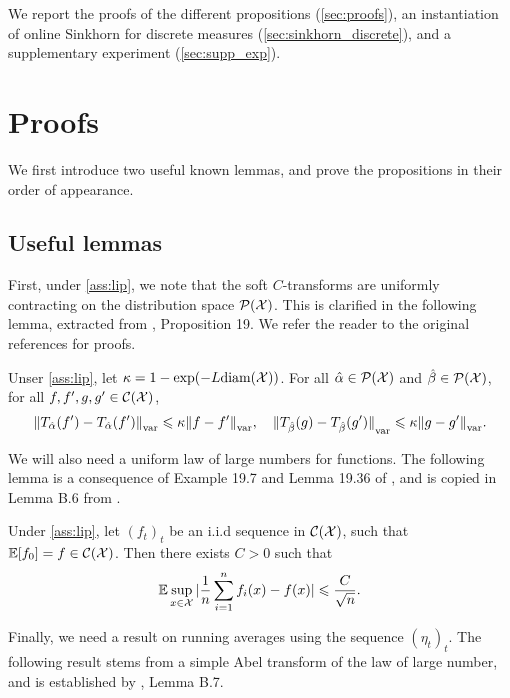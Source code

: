 We report the proofs of the different propositions (\autoref{sec:proofs}), an instantiation of online Sinkhorn for discrete measures (\autoref{sec:sinkhorn_discrete}), and a supplementary experiment (\autoref{sec:supp_exp}).

\section{Proofs}\label{sec:proofs}

We first introduce two useful known lemmas, and prove the propositions in their order of appearance.

\subsection{Useful lemmas}

First, under \autoref{ass:lip}, we note that the soft $C$-transforms are
 uniformly contracting on the distribution space $\mathcal{P}(\mathcal{X})$. This is clarified
 in the following lemma, extracted from \citet{vialard2019elementary},
 Proposition 19. We refer the reader to the original references for proofs.

\begin{lemma}\label{lemma:contractance}
    Unser \autoref{ass:lip}, let $\kappa = 1 - \exp(-L
    \textnormal{diam}(\mathcal{X}))$. For all $\hat \alpha \in \mathcal{P}(\mathcal{X})$ and $\hat \beta \in
    \mathcal{P}(\mathcal{X})$, for all $f, f', g, g' \in \mathcal{C}(\mathcal{X})$,
    \begin{equation}
        {\Vert T_{\hat \alpha}(f') - 
        T_{\hat \alpha}(f') \Vert}_{\text{\upshape var}} \leqslant \kappa {\Vert f - f' \Vert}_{\text{\upshape var}},
        \quad
        {\Vert T_{\hat \beta}(g) - 
        T_{\hat \beta}(g') \Vert}_{\text{\upshape var}} \leqslant \kappa {\Vert g - g' \Vert}_{\text{\upshape var}}.
    \end{equation}
\end{lemma}

We will also need a uniform law of large numbers for functions. The following lemma is a consequence of Example 19.7 and
Lemma 19.36 of \citet{van_der_vaart_asymptotic_2000}, and is copied in Lemma B.6 from \citet{mairal_stochastic_2013}.

\begin{lemma}\label{lemma:lln}
    Under \autoref{ass:lip}, let $(f_t)_t$ be an i.i.d sequence in $\mathcal{C}(\mathcal{X})$,
    such that $\mathbb{E}[f_0] = f \in \mathcal{C}(\mathcal{X})$. Then there exists $C > 0$ such that
    \begin{equation}
        \mathbb{E} \sup_{x \in \mathcal{X}} | \frac{1}{n} \sum_{i=1}^n f_i(x) - f(x) |
        \leqslant \frac{C}{\sqrt{n}}.
    \end{equation}
\end{lemma}
Finally, we need a result on running averages using the sequence ${(\eta_t)}_t$. The following result stems from a simple Abel transform of the law of large number, and is established by \citet{mairal_stochastic_2013}, Lemma B.7.

